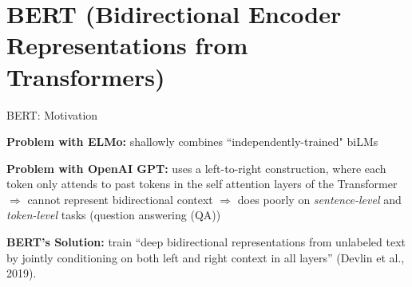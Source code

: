


\section{BERT (Bidirectional Encoder Representations from Transformers)}


\begin{frame}{BERT: Motivation}
    \normalsize 
    
    \begin{itemizeSpaced}{7pt}
        \item \textbf{Problem with ELMo: } shallowly combines ``independently-trained" biLMs
        
        \item \textbf{Problem with OpenAI GPT: }uses a left-to-right construction, where each token only attends to past tokens in the self attention layers of the Transformer $\Rightarrow$ cannot represent bidirectional context $\Rightarrow$ does poorly on \emph{sentence-level} and \emph{token-level} tasks (question answering (QA))

        
        \pinkbox \textbf{BERT's Solution: } train ``deep bidirectional representations from unlabeled text by jointly conditioning on both left and right context in all layers” (Devlin et al., 2019).
    \end{itemizeSpaced}
    
\end{frame}


